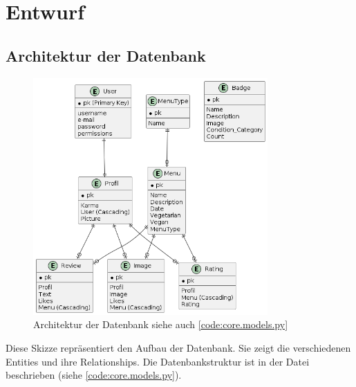 \chapter{Entwurf} \label{chap:entwurf}

\section{Architektur der Datenbank} \label{sec:DB}
\begin{figure}[ht]
    \centering
    \includegraphics[width=0.8\textwidth]{images/Database.png}
    \caption{Architektur der Datenbank siehe auch \ref{code:core.models.py}}
    \label{fig:DB}
\end{figure}

Diese Skizze repräsentiert den Aufbau der Datenbank. Sie zeigt die verschiedenen
Entities und ihre Relationships. Die Datenbankstruktur ist in der Datei
 beschrieben (siehe \ref{code:core.models.py}).

